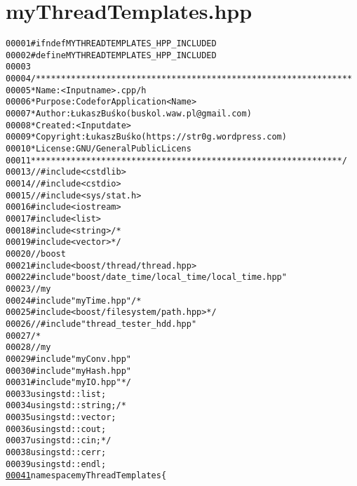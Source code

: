 \hypertarget{myThreadTemplates_8hpp_source}{
\section{myThreadTemplates.hpp}
}


\begin{footnotesize}\begin{alltt}
00001 \textcolor{preprocessor}{#ifndef MYTHREADTEMPLATES\_HPP\_INCLUDED}
00002 \textcolor{preprocessor}{}\textcolor{preprocessor}{#define MYTHREADTEMPLATES\_HPP\_INCLUDED}
00003 \textcolor{preprocessor}{}
00004 \textcolor{comment}{/***************************************************************}
00005 \textcolor{comment}{ * Name:      <Input name>.cpp/h}
00006 \textcolor{comment}{ * Purpose:   Code for Application <Name>}
00007 \textcolor{comment}{ * Author:    Łukasz Buśko (buskol.waw.pl@gmail.com)}
00008 \textcolor{comment}{ * Created:   <Input date>}
00009 \textcolor{comment}{ * Copyright: Łukasz Buśko (https://str0g.wordpress.com)}
00010 \textcolor{comment}{ * License:   GNU / General Public Licens}
00011 \textcolor{comment}{ **************************************************************/}
00013 \textcolor{comment}{//#include <cstdlib>}
00014 \textcolor{comment}{//#include <cstdio>}
00015 \textcolor{comment}{//#include <sys/stat.h>}
00016 \textcolor{preprocessor}{#include <iostream>}
00017 \textcolor{preprocessor}{#include <list>}
00018 \textcolor{preprocessor}{#include <string>}\textcolor{comment}{/*}
00019 \textcolor{comment}{#include <vector>*/}
00020 \textcolor{comment}{//boost}
00021 \textcolor{preprocessor}{#include <boost/thread/thread.hpp>}
00022 \textcolor{preprocessor}{#include "boost/date\_time/local\_time/local\_time.hpp"}
00023 \textcolor{comment}{//my}
00024 \textcolor{preprocessor}{#include "myTime.hpp"}\textcolor{comment}{/*}
00025 \textcolor{comment}{#include <boost/filesystem/path.hpp>*/}
00026 \textcolor{comment}{//#include "thread\_tester\_hdd.hpp"}
00027 \textcolor{comment}{/*}
00028 \textcolor{comment}{//my}
00029 \textcolor{comment}{#include "myConv.hpp"}
00030 \textcolor{comment}{#include "myHash.hpp"}
00031 \textcolor{comment}{#include "myIO.hpp"*/}
00033 \textcolor{keyword}{using} std::list;
00034 \textcolor{keyword}{using} std::string;\textcolor{comment}{/*}
00035 \textcolor{comment}{using std::vector;}
00036 \textcolor{comment}{using std::cout;}
00037 \textcolor{comment}{using std::cin;*/}
00038 \textcolor{keyword}{using} std::cerr;
00039 \textcolor{keyword}{using} std::endl;
\hypertarget{myThreadTemplates_8hpp_source_l00041}{}\hyperlink{namespacemyThreadTemplates}{00041} \textcolor{keyword}{namespace }myThreadTemplates\{

\end{alltt}
\end{footnotesize}

